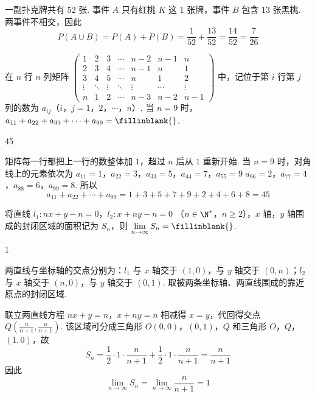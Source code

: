 \begin{solution}
一副扑克牌共有 \(52\) 张. 事件 \(A\) 只有红桃 \(K\) 这 \(1\) 张牌，事件 \(B\) 包含 \(13\) 张黑桃. 两事件不相交，因此
\[
P(A\cup B)=P(A)+P(B)=\frac{1}{52}+\frac{13}{52}=\frac{14}{52}=\frac{7}{26}
\]
\end{solution}

\begin{problem}
在 \(n\) 行 \(n\) 列矩阵 \(\begin{pmatrix}1&2&3&\cdots&n-2&n-1&n\\2&3&4&\cdots&n-1&n&1\\3&4&5&\cdots&n&1&2\\\vdots&\ddots&\vdots&\ddots&\vdots&\cdots&\vdots\\n&1&2&\cdots&n-3&n-2&n-1\end{pmatrix}\) 中，记位于第 \(i\) 行第 \(j\) 列的数为 \(a_{ij}\)（\(i\)，\(j=1\)，\(2\)，\(\cdots\)，\(n\)）. 当 \(n = 9\) 时，\(a_{11} + a_{22} + a_{33} + \cdots + a_{99} =\fillinblank{}\).
\end{problem}

\begin{answer}
45
\end{answer}

\begin{solution}
矩阵每一行都把上一行的数整体加 \(1\)，超过 \(n\) 后从 \(1\) 重新开始. 当 \(n=9\) 时，对角线上的元素依次为
\(a_{11}=1\)，\(a_{22}=3\)，\(a_{33}=5\)，\(a_{44}=7\)，\(a_{55}=9\)
\(a_{66}=2\)，\(a_{77}=4\)，\(a_{88}=6\)，\(a_{99}=8\).
所以
\[
a_{11}+a_{22}+\cdots+a_{99}=1+3+5+7+9+2+4+6+8=45
\]
\end{solution}

\begin{problem}
将直线 \(l_1: nx + y - n = 0\)，\(l_2: x + ny - n = 0\) （\(n \in \N^*\)，\(n \geqslant 2\)），\(x\) 轴，\(y\) 轴围成的封闭区域的面积记为 \(S_n\)，则 \(\displaystyle\lim_{n \to \infty} S_n =\fillinblank{}\).
\end{problem}

\begin{answer}
1
\end{answer}

\begin{solution}
两直线与坐标轴的交点分别为：\(l_1\) 与 \(x\) 轴交于 \((1,0)\)，与 \(y\) 轴交于 \((0,n)\)；\(l_2\) 与 \(x\) 轴交于 \((n,0)\)，与 \(y\) 轴交于 \((0,1)\). 取被两条坐标轴、两直线围成的靠近原点的封闭区域.

联立两直线方程
\(nx+y=n\)，\(x+ny=n\)
相减得 \(x=y\)，代回得交点 \(Q\left(\frac{n}{n+1},\frac{n}{n+1}\right)\). 该区域可分成三角形 \(O(0,0)\)，\((0,1)\)，\(Q\) 和三角形 \(O\)，\(Q\)，\((1,0)\)，故
\[
S_n=\frac12\cdot1\cdot\frac{n}{n+1}+\frac12\cdot1\cdot\frac{n}{n+1}=\frac{n}{n+1}
\]
因此
\[
\lim_{n\to\infty}S_n=\lim_{n\to\infty}\frac{n}{n+1}=1
\]
\end{solution}


